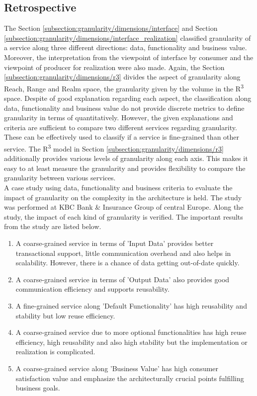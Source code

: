 \subsection{Retrospective}\label{subsection:granularity/dimensions/retrospective}
The Section \ref{subsection:granularity/dimensions/interface} and Section \ref{subsection:granularity/dimensions/interface_realization} classified granularity of a service along three different directions: data, functionality and business value. Moreover, the interpretation from the viewpoint of interface by consumer and the viewpoint of producer for realization were also made.
Again, the Section \ref{subsection:granularity/dimensions/r3} divides the aspect of granularity along Reach, Range and Realm space, the granularity given by the volume in the R\textsuperscript{3} space.
Despite of good explanation regarding each aspect, the classification along data, functionality and business value do not provide discrete metrics to define granularity in terms of quantitatively. However, the given explanations and criteria are sufficient to compare two different services regarding granularity. These can be effectively used to classify if a service is fine-grained than other service.
The R\textsuperscript{3} model in Section \ref{subsection:granularity/dimensions/r3} additionally provides various levels of granularity along each axis. This makes it easy to at least measure the granularity and provides flexibility to compare the granularity between various services.
\\
A case study \cite{Pierre-Reldin:2007aa} using data, functionality and business criteria to evaluate the impact of granularity on the complexity in the architecture is held. The study was performed at KBC Bank & Insurance Group of central Europe. Along the study, the impact of each kind of granularity is verified. The important results from the study are listed below.

\begin{enumerate}
\item A coarse-grained service in terms of 'Input Data' provides better transactional support, little communication overhead and also helps in scalability. However, there is a chance of data getting out-of-date quickly.
\item A coarse-grained service in terms of 'Output Data' also provides good communication efficiency and supports reusability.
\item A fine-grained service along 'Default Functionality' has high reusability and stability but low reuse efficiency.
\item A coarse-grained service due to more optional functionalities has high reuse efficiency, high reusability and also high stability but the implementation or realization is complicated.
\item A coarse-grained service along 'Business Value' has high consumer satisfaction value and emphasize the architecturally crucial points fulfilling business goals.
\end{enumerate}

